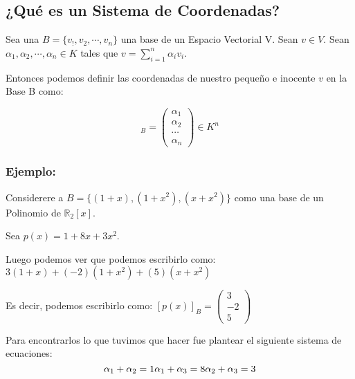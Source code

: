 \documentclass[12pt]{report}							    %
\begin{document}
        \subsection{¿Qué es un Sistema de Coordenadas?}
        Sea una $B = \{ v_!, v_2, \cdots, v_n\}$ una base de un Espacio Vectorial V.
        Sean $v \in V$.
        Sean $\alpha_1, \alpha_2, \cdots, \alpha_n \in K$ tales que $v = \sum_{i=1}^{n} \alpha_i v_i$.

        Entonces podemos definir las coordenadas de nuestro pequeño e inocente $v$ en la Base B como:

        \begin{equation}
            [v]_B = 
            \begin{pmatrix} 
                \alpha_1    \\
                \alpha_2    \\
                \cdots      \\
                \alpha_n 
            \end{pmatrix}
            \in K^n
        \end{equation}


        \clearpage

        \subsubsection{Ejemplo:}
        Considerere a $B = \{ (1+x), (1+x^2) , (x + x^2) \}$ como una base de un Polinomio de $\mathbb{R}_2[x]$.

        Sea $p(x) = 1+8x+3x^2$.

        Luego podemos ver que podemos escribirlo como:
        $3(1+x) + (-2)(1+x^2) + (5)(x+x^2)$

        Es decir, podemos escribirlo como:
        $[p(x)]_B =  \begin{pmatrix} 3\\-2\\5\end{pmatrix}$
         

        Para encontrarlos lo que tuvimos que hacer fue plantear el siguiente sistema de ecuaciones:
        \begin{equation*}
            \alpha_1 + \alpha_2 = 1  \\
            \alpha_1 + \alpha_3 = 8  \\
            \alpha_2 + \alpha_3 = 3  \\
        \end{equation*}
\end{document}
